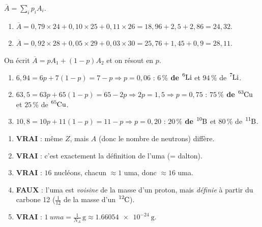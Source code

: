 \documentclass[11pt,a4paper]{article}
\begin{document}
\begin{corrige}
$\overline{A} = \sum_i p_i A_i$.
\begin{enumerate}[label=\alph*)]
  \item $\overline{A} = 0{,}79\times 24 + 0{,}10\times 25 + 0{,}11\times 26 = 18{,}96 + 2{,}5 + 2{,}86
        = 24{,}32$.
  \item $\overline{A} = 0{,}92\times 28 + 0{,}05\times 29 + 0{,}03\times 30 = 25{,}76 + 1{,}45 + 0{,}9
        = 28{,}11$.
\end{enumerate}
\end{corrige}

\begin{corrige}
On écrit $\overline{A} = pA_1 + (1-p)A_2$ et on résout en $p$.
\begin{enumerate}[label=\alph*)]
  \item $6{,}94 = 6p + 7(1-p) = 7 - p \Rightarrow p = 0{,}06$ : \textbf{$6\,\%$ de $\ce{^{6}Li}$} et
        $94\,\%$ de $\ce{^{7}Li}$.
  \item $63{,}5 = 63p + 65(1-p) = 65 - 2p \Rightarrow 2p = 1{,}5 \Rightarrow p = 0{,}75$ :
        \textbf{$75\,\%$ de $\ce{^{63}Cu}$} et $25\,\%$ de $\ce{^{65}Cu}$.
  \item $10{,}8 = 10p + 11(1-p) = 11 - p \Rightarrow p = 0{,}20$ : \textbf{$20\,\%$ de $\ce{^{10}B}$}
        et $80\,\%$ de $\ce{^{11}B}$.
\end{enumerate}
\end{corrige}

\begin{corrige}
\begin{enumerate}[label=\alph*)]
  \item \textbf{\textcolor{excol}{VRAI}} : même $Z$, mais $A$ (donc le nombre de neutrons) diffère.
  \item \textbf{\textcolor{excol}{VRAI}} : c'est exactement la définition de l'uma (= dalton).
  \item \textbf{\textcolor{excol}{VRAI}} : $16$ nucléons, chacun $\approx 1$ uma, donc $\approx 16$ uma.
  \item \textbf{\textcolor{attncol}{FAUX}} : l'uma est \emph{voisine} de la masse d'un proton, mais
        \emph{définie} à partir du carbone 12 ($\tfrac{1}{12}$ de la masse d'un $\ce{^{12}C}$).
  \item \textbf{\textcolor{excol}{VRAI}} : $\SI{1}{uma} = \tfrac{1}{N_{\!A}}\,\si{\gram}
        \approx \SI{1,66054e-24}{\gram}$.
\end{enumerate}
\end{corrige}
\end{document}
